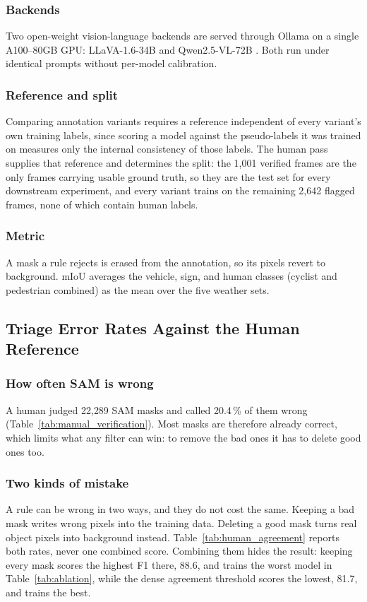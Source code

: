 \documentclass[journal]{IEEEtran}
\begin{document}
\subsubsection{Backends}
Two open-weight vision-language backends are served through Ollama on a single A100--80GB GPU: LLaVA-1.6-34B \cite{liu2024llava} and Qwen2.5-VL-72B \cite{bai2025qwen25vl}.
Both run under identical prompts without per-model calibration.

\subsubsection{Reference and split}
Comparing annotation variants requires a reference independent of every variant's own training labels, since scoring a model against the pseudo-labels it was trained on measures only the internal consistency of those labels.
The human pass supplies that reference and determines the split: the 1{,}001 verified frames are the only frames carrying usable ground truth, so they are the test set for every downstream experiment, and every variant trains on the remaining 2{,}642 flagged frames, none of which contain human labels.

\subsubsection{Metric}
A mask a rule rejects is erased from the annotation, so its pixels revert to background.
mIoU averages the vehicle, sign, and human classes (cyclist and pedestrian combined) as the mean over the five weather sets.





\subsection{Triage Error Rates Against the Human Reference}
\label{exp:triage}

\subsubsection{How often SAM is wrong}
A human judged 22{,}289 SAM masks and called 20.4\,\% of them wrong (Table~\ref{tab:manual_verification}).
Most masks are therefore already correct, which limits what any filter can win: to remove the bad ones it has to delete good ones too.

\subsubsection{Two kinds of mistake}
A rule can be wrong in two ways, and they do not cost the same.
Keeping a bad mask writes wrong pixels into the training data.
Deleting a good mask turns real object pixels into background instead.
Table~\ref{tab:human_agreement} reports both rates, never one combined score.
Combining them hides the result: keeping every mask scores the highest F1 there, 88.6, and trains the worst model in Table~\ref{tab:ablation}, while the dense agreement threshold scores the lowest, 81.7, and trains the best.
\end{document}
